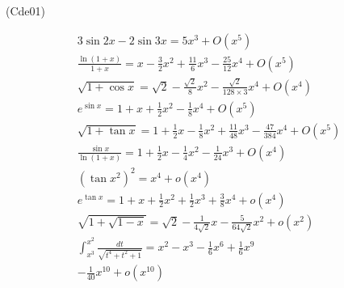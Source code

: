 \begin{tiny}(Cde01)\end{tiny}
\begin{multline*}
3\sin 2x-2\sin 3x =  5x^{3}+O\left( x^{5}\right) \\
\frac{\ln (1+x)}{1+x} = x-\frac{3}{2}x^{2}+\frac{11}{6}x^{3}  -\frac{25}{12} x^{4}+O\left( x^{5}\right)\\
\sqrt{1+\cos x} = \sqrt{2} -\frac{\sqrt{2}}{8} x^{2} - \frac{\sqrt{2}}{128 \times 3}x^4 + O(x^{4}) \\
e^{\sin x} = 1+x+\frac{1}{2}x^{2} -\frac{1}{8}x^{4}+O\left( x^{5}\right) \\
\sqrt{1+\tan x} = 1+\frac{1}{2}x-\frac{1}{8}x^{2}+\frac{11}{48}x^{3} 
  -\frac{47}{384}x^{4}+O\left( x^{5}\right)\\
\frac{\sin x}{\ln (1+x)} = 1+\frac{1}{2}x-\frac{1}{4}x^{2} -\frac{1}{24} x^{3} + O\left( x^{4}\right) \\
\left( \tan x^{2}\right)^{2} = x^4 +o\left( x^{4}\right)\\
e^{\tan x} = 1+x+\frac{1}{2}x^2+\frac{1}{2}x^3 
  +\frac{3}{8}x^4 + o(x^4)\\
\sqrt{1+\sqrt{1-x}} = \sqrt{2}-\frac{1}{4\sqrt{2}}x -\frac{5}{64\sqrt{2}}x^2+o(x^2)\\
\int_{x^3}^{x^2}\frac{dt}{\sqrt{t^4 + t^2 + 1}} = x^2 - x^3 -\frac{1}{6}x^6 + \frac{1}{6}x^9 \\
  -\frac{1}{40}x^{10} + o(x^{10}) 
\end{multline*}
